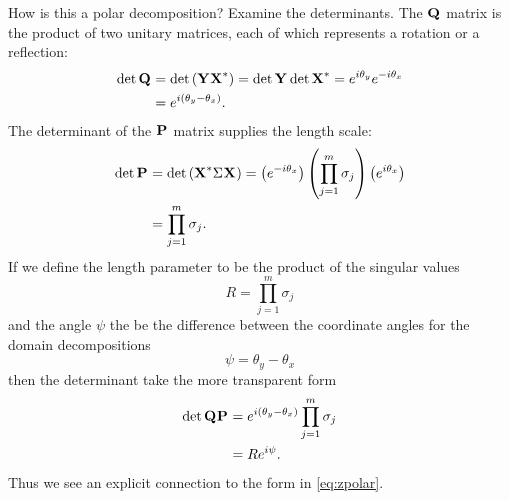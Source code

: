 How is this a polar decomposition? Examine the determinants. The $\textbf{Q}^{\mathrm{}}$ matrix is the product of two unitary matrices, each of which represents a rotation or a reflection:
\begin{equation}
  \begin{split}
      \det \textbf{Q}^{\mathrm{}} &= \det \left( \textbf{Y}^{\mathrm{}}\textbf{X}^{\mathrm{*}} \right) = \det \textbf{Y}^{\mathrm{}} \det \textbf{X}^{\mathrm{*}} = e^{i \theta_{y}}e^{-i \theta_{x}}\\
  & = e^{i \left( \theta_{y}-\theta_{x} \right)}.
  \end{split}
\end{equation}
The determinant of the $\textbf{P}^{\mathrm{}}$ matrix supplies the length scale:
\begin{equation}
  \begin{split}
    \det \textbf{P}^{\mathrm{}} &= \det \left( \textbf{X}^{\mathrm{*}}\Sigma^{\mathrm{}}\textbf{X}^{\mathrm{}} \right) = \left( e^{-i \theta_{x}} \right)\left( \prod_{j=1}^{m}{\sigma_{j}} \right)\left( e^{i \theta_{x}} \right)\\
     &=\prod_{j=1}^{m}{\sigma_{j}}.
  \end{split}
\end{equation}
If we define the length parameter to be the product of the singular values
\begin{equation}
  R = \prod_{j=1}^{m}{\sigma_{j}}
\end{equation}
and the angle $\psi$ the be the difference between the coordinate angles for the domain decompositions
\begin{equation}
  \psi = \theta_{y}-\theta_{x}
\end{equation}
then the determinant take the more transparent form
\begin{equation}
  \begin{split}
    \det \textbf{Q}^{\mathrm{}}\textbf{P}^{\mathrm{}} &= e^{i\left( \theta_{y}-\theta_{x} \right)}\prod_{j=1}^{m}{\sigma_{j}} \\
      &= R e^{i\psi}.
  \end{split}
\end{equation}
Thus we see an explicit connection to the form in \eqref{eq:zpolar}.



\endinput